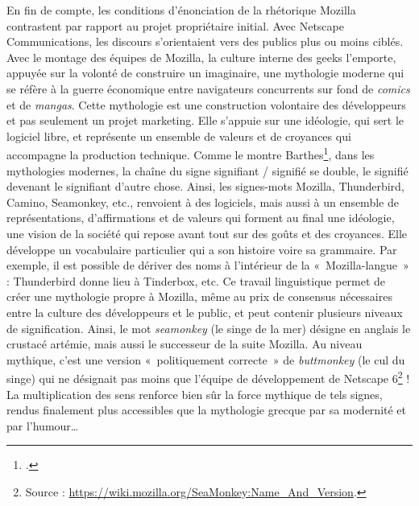 \documentclass{FramateX}
\begin{document}
\begin{refsection}
En fin de compte, les conditions d'énonciation de la rhétorique Mozilla
contrastent par rapport au projet propriétaire initial. Avec Netscape
Communications, les discours s'orientaient vers des publics plus ou
moins ciblés. Avec le montage des équipes de Mozilla, la culture
interne des geeks l'emporte, appuyée sur la volonté de construire un
imaginaire, une mythologie moderne qui se réfère à la guerre économique
entre navigateurs concurrents sur fond de \emph{comics} et de
\textit{mangas}. Cette mythologie est une construction volontaire des
développeurs et pas seulement un projet marketing. Elle s'appuie sur
une idéologie, qui sert le logiciel libre, et représente un ensemble de
valeurs et de croyances qui accompagne la production technique. Comme
le montre Barthes\footnote{\cite{barthesmythologies1957}.}, dans les mythologies modernes, la chaîne du
signe signifiant / signifié se double, le signifié devenant le
signifiant d'autre chose. Ainsi, les signes-mots Mozilla, Thunderbird,
Camino, Seamonkey, etc., renvoient à des logiciels, mais aussi à un
ensemble de représentations, d'affirmations et de valeurs qui forment
au final une idéologie, une vision de la société qui repose avant tout
sur des goûts et des croyances. Elle développe un vocabulaire
particulier qui a son histoire voire sa grammaire. Par exemple, il est
possible de dériver des noms à l'intérieur de la «~Mozilla-langue~» :
Thunderbird donne lieu à Tinderbox, etc. Ce travail linguistique permet
de créer une mythologie propre à Mozilla, même au prix de consensus
nécessaires entre la culture des développeurs et le public, et peut
contenir plusieurs niveaux de signification. Ainsi, le mot
\textit{seamonkey} (le singe de la mer) désigne en anglais le crustacé
artémie, mais aussi le successeur de la suite Mozilla. Au niveau
mythique, c'est une version «~politiquement correcte~» de
\textit{buttmonkey} (le cul du singe) qui ne désignait pas moins que
l'équipe de développement de Netscape
6\footnote{Source : \url{https://wiki.mozilla.org/SeaMonkey:Name_And_Version}.} ! La
multiplication des sens renforce bien sûr la force mythique de tels
signes, rendus finalement plus accessibles que la mythologie grecque
par sa modernité et par l'humour\ldots


\end{refsection}
\end{document}
